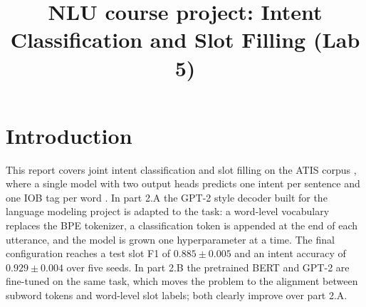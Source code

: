 \documentclass[a4paper]{article}
\title{NLU course project: Intent Classification and Slot Filling (Lab 5)}
\begin{document}
\maketitle

\section{Introduction}
This report covers joint intent classification and slot filling on the ATIS corpus \cite{hemphill1990atis}, where a single model with two output heads predicts one intent per sentence and one IOB tag per word \cite{ramshaw1995iob}. In part 2.A the GPT-2 style decoder built for the language modeling project is adapted to the task: a word-level vocabulary replaces the BPE tokenizer, a classification token is appended at the end of each utterance, and the model is grown one hyperparameter at a time. The final configuration reaches a test slot F1 of $0.885 \pm 0.005$ and an intent accuracy of $0.929 \pm 0.004$ over five seeds. In part 2.B the pretrained BERT \cite{devlin2019bert} and GPT-2 \cite{radford2019gpt2} are fine-tuned on the same task, which moves the problem to the alignment between subword tokens and word-level slot labels; both clearly improve over part 2.A.
\end{document}
